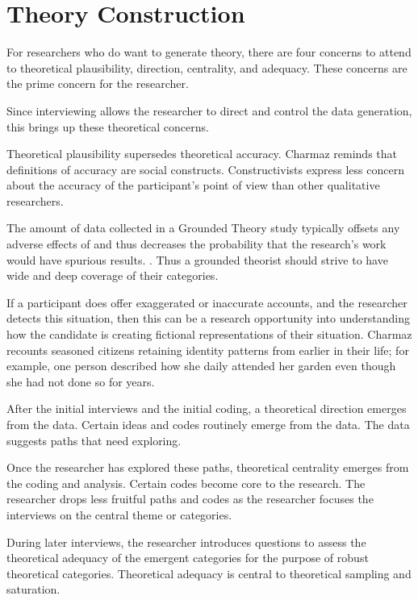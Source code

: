 \section{Theory Construction}
For researchers who do want to generate theory, there are four concerns to attend to theoretical plausibility, direction, centrality, and adequacy. These concerns are the prime concern for the researcher.

Since interviewing allows the researcher to direct and control the data generation, this brings up these theoretical concerns. 

Theoretical plausibility supersedes theoretical accuracy. Charmaz reminds that definitions of accuracy are social constructs. Constructivists express less concern about the accuracy of the participant's point of view than other qualitative researchers.

The amount of data collected in a Grounded Theory study typically offsets any adverse effects of  and thus decreases the probability that the research's work would have spurious results.  \cite{Charmaz}. Thus a grounded theorist should strive to have wide and deep coverage of their categories. 

If a participant does offer exaggerated or inaccurate accounts, and the researcher detects this situation, then this can be a research opportunity into understanding how the candidate is creating fictional representations of their situation. Charmaz recounts seasoned citizens retaining identity patterns from earlier in their life; for example, one person described how she daily attended her garden even though she had not done so for years.

After the initial interviews and the initial coding, a theoretical direction emerges from the data. Certain ideas and codes routinely emerge from the data. The data suggests paths that need exploring.

Once the researcher has explored these paths, theoretical centrality emerges from the coding and analysis. Certain codes become core to the research. The researcher drops less fruitful paths and codes as the researcher focuses the interviews on the central theme or categories. 

During later interviews, the researcher introduces questions to assess the theoretical adequacy of the emergent categories for the purpose of robust theoretical categories. Theoretical adequacy is central to theoretical sampling and saturation. 

